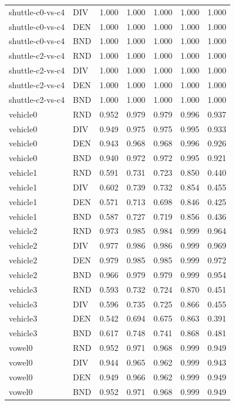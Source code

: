 \documentclass[10pt,a4paper]{article}
\begin{document}
\begin{longtable}{lllllrr}
shuttle-c0-vs-c4 & DIV & 1.000 & 1.000 & 1.000 & 1.000 & 1.000 \\
shuttle-c0-vs-c4 & DEN & 1.000 & 1.000 & 1.000 & 1.000 & 1.000 \\
shuttle-c0-vs-c4 & BND & 1.000 & 1.000 & 1.000 & 1.000 & 1.000 \\
shuttle-c2-vs-c4 & RND & 1.000 & 1.000 & 1.000 & 1.000 & 1.000 \\
shuttle-c2-vs-c4 & DIV & 1.000 & 1.000 & 1.000 & 1.000 & 1.000 \\
shuttle-c2-vs-c4 & DEN & 1.000 & 1.000 & 1.000 & 1.000 & 1.000 \\
shuttle-c2-vs-c4 & BND & 1.000 & 1.000 & 1.000 & 1.000 & 1.000 \\
vehicle0 & RND & 0.952 & 0.979 & 0.979 & 0.996 & 0.937 \\
vehicle0 & DIV & 0.949 & 0.975 & 0.975 & 0.995 & 0.933 \\
vehicle0 & DEN & 0.943 & 0.968 & 0.968 & 0.996 & 0.926 \\
vehicle0 & BND & 0.940 & 0.972 & 0.972 & 0.995 & 0.921 \\
vehicle1 & RND & 0.591 & 0.731 & 0.723 & 0.850 & 0.440 \\
vehicle1 & DIV & 0.602 & 0.739 & 0.732 & 0.854 & 0.455 \\
vehicle1 & DEN & 0.571 & 0.713 & 0.698 & 0.846 & 0.425 \\
vehicle1 & BND & 0.587 & 0.727 & 0.719 & 0.856 & 0.436 \\
vehicle2 & RND & 0.973 & 0.985 & 0.984 & 0.999 & 0.964 \\
vehicle2 & DIV & 0.977 & 0.986 & 0.986 & 0.999 & 0.969 \\
vehicle2 & DEN & 0.979 & 0.985 & 0.985 & 0.999 & 0.972 \\
vehicle2 & BND & 0.966 & 0.979 & 0.979 & 0.999 & 0.954 \\
vehicle3 & RND & 0.593 & 0.732 & 0.724 & 0.870 & 0.451 \\
vehicle3 & DIV & 0.596 & 0.735 & 0.725 & 0.866 & 0.455 \\
vehicle3 & DEN & 0.542 & 0.694 & 0.675 & 0.863 & 0.391 \\
vehicle3 & BND & 0.617 & 0.748 & 0.741 & 0.868 & 0.481 \\
vowel0 & RND & 0.952 & 0.971 & 0.968 & 0.999 & 0.949 \\
vowel0 & DIV & 0.944 & 0.965 & 0.962 & 0.999 & 0.943 \\
vowel0 & DEN & 0.949 & 0.966 & 0.962 & 0.999 & 0.949 \\
vowel0 & BND & 0.952 & 0.971 & 0.968 & 0.999 & 0.949 \\

\end{longtable}
\end{document}

